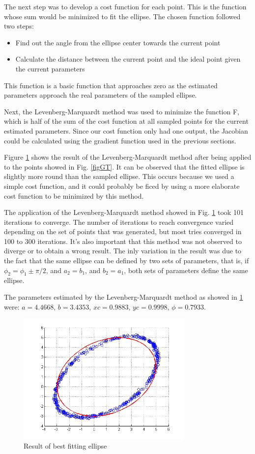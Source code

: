 \documentclass[journal]{IEEEtran}
\begin{document}
The next step was to develop a cost function for each point. This is the function whose sum would be minimized to fit the ellipse. The chosen function followed two steps: 

\begin{itemize}
    \item Find out the angle from the ellipse center towards the current point
    \item Calculate the distance between the current point and the ideal point given the current parameters
\end{itemize}

This function is a basic function that approaches zero as the estimated parameters approach the real parameters of the sampled ellipse.

Next, the Levenberg-Marquardt method was used to minimize the function F, which is half of the sum of the cost function at all sampled points for the current estimated parameters. Since our cost function only had one output, the Jacobian could be calculated using the gradient function used in the previous sections.

Figure \ref{figFE} shows the result of the Levenberg-Marquardt method after being applied to the points showed in Fig. \ref{figGT}. It can be observed that the fitted ellipse is slightly more round than the sampled ellipse. This occurs because we used a simple cost function, and it could probably be ficed by using a more elaborate cost function to be minimized by this method.

The application of the Levenberg-Marquardt method showed in Fig. \ref{figFE} took 101 iterations to converge. The number of iterations to reach convergence varied depending on the set of points that was generated, but most tries converged in 100 to 300 iterations. It's also important that this method was not observed to diverge or to obtain a wrong result. The inly variation in the result was due to the fact that the same ellipse can be defined by two sets of parameters, that is, if $\phi _2 = \phi _1 \pm \pi/2$, and $a_2 = b_1$, and $b_2 = a_1$, both sets of parameters define the same ellipse.

The parameters estimated by the Levenberg-Marquardt method as showed in \ref{figFE} were: $a=4.4668$, $b=3.4353$, $xc=0.9883$, $yc=0.9998$, $\phi = 0.7933$.

\begin{figure}[H]
\centering
\includegraphics[width=3.4in]{figures/nd-fittedEllipse.png}
\caption{Result of best fitting ellipse}
\label{figFE}
\end{figure}
\end{document}

